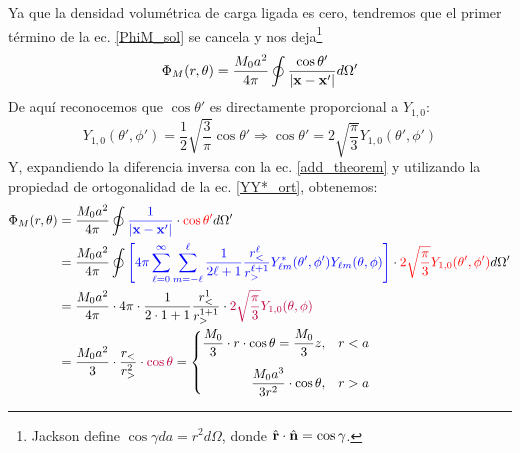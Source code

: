 \documentclass[]{article}
\numberwithin{equation}{section}
\begin{document}
Ya que la densidad volumétrica de carga ligada es cero, tendremos que el primer término de la ec. \ref{PhiM_sol} se cancela y nos deja\footnote{Jackson define \(\cos\gamma da = r^2 d\Omega\), donde \(\hat{\mathbf{r}}\cdot\hat{\mathbf{n}} = \cos\gamma\).}
\begin{equation}
	\Phi_{M}(r,\theta) = \frac{M_0 a^2}{4\pi} \oint \frac{\cos\theta'}{|\mathbf{x} - \mathbf{x}'|} d\Omega'
\end{equation}
De aquí reconocemos que \(\cos\theta'\) es directamente proporcional a \(Y_{1,0}\):
\begin{equation}
	Y_{1,0}(\theta',\phi') = \frac{1}{2}\sqrt{\frac{3}{\pi}} \cos\theta' \Rightarrow \cos\theta' = 2\sqrt{\frac{\pi}{3}} Y_{1,0}(\theta',\phi')
\end{equation}
Y, expandiendo la diferencia inversa con la ec. \ref{add_theorem} y utilizando la propiedad de ortogonalidad de la ec. \ref{YY*_ort}, obtenemos:
\begin{align}
	\Phi_{M}(r,\theta) &= \frac{M_0 a^2}{4\pi} \oint \textcolor{blue}{\frac{1}{|\xv - \xv'|} } \cdot \textcolor{red}{\cos\theta'} d\Omega' \nonumber\\
	&= \frac{M_0 a^2}{4\pi} \oint \textcolor{blue}{\left[4\pi \sum_{\ell=0}^{\infty} \sum_{m=-\ell}^{\ell} \frac{1}{2\ell + 1} \frac{r_{<}^{\ell}}{r_{>}^{\ell + 1}} Y^{*}_{\ell m}(\theta', \phi') Y_{\ell m}(\theta, \phi)\right] } \cdot \textcolor{red}{2\sqrt{\frac{\pi}{3}} Y_{1,0}(\theta',\phi')} d\Omega' \nonumber\\
	&= \frac{M_0 a^2}{4\pi} \cdot 4\pi \cdot \frac{1}{2\cdot 1 + 1} \frac{r_{<}^{1}}{r_{>}^{1 + 1}} \cdot \textcolor{purple}{2 \sqrt{\frac{\pi}{3}}  Y_{1,0}(\theta,\phi)} \nonumber\\
	&= \frac{M_0 a^2}{3} \cdot \frac{r_{<}}{r_{>}^{2}} \cdot \textcolor{purple}{\cos\theta} = \left\lbrace \begin{matrix}
		\dfrac{M_0}{3} \cdot r \cdot \cos\theta = \dfrac{M_0}{3} z, & r < a \vspace{3mm}\\
		\hfill\dfrac{M_0 a^3}{3 r^2} \cdot \cos\theta, & r > a
	\end{matrix}\right.
\end{align}
\end{document}
